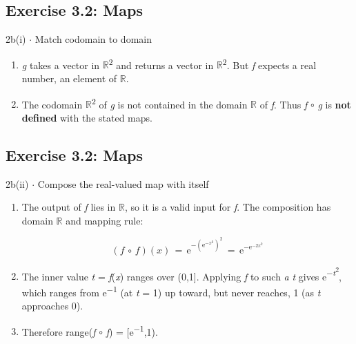 \documentclass[11pt]{article}
\begin{document}
\begin{keepsection}\subsection{Exercise 3.2: Maps}

\begin{workedbox}{2b(i) \ensuremath{\cdot} Match codomain to domain}
\begin{enumerate}
\item \textit{g} takes a vector in \ensuremath{\mathbb{R}}\textsuperscript{2} and returns a vector in \ensuremath{\mathbb{R}}\textsuperscript{2}. But \textit{f} expects a real number, an element of \ensuremath{\mathbb{R}}.
\item The codomain \ensuremath{\mathbb{R}}\textsuperscript{2} of \textit{g} is not contained in the domain \ensuremath{\mathbb{R}} of \textit{f}. Thus \textit{f} \ensuremath{\circ} \textit{g} is \textbf{not defined} with the stated maps.
\end{enumerate}
\end{workedbox}

\end{keepsection}
\begin{keepsection}\subsection{Exercise 3.2: Maps}

\begin{workedbox}{2b(ii) \ensuremath{\cdot} Compose the real-valued map with itself}
\begin{enumerate}
\item {}
The output of \textit{f} lies in \ensuremath{\mathbb{R}}, so it is a valid input for \textit{f}. The composition has domain \ensuremath{\mathbb{R}} and mapping rule:

\begin{equation*}({f}\, \circ \, {f})({x})\, =\, \mathrm{e}^{-(\mathrm{e}^{-{x}^{2}})^{2}}\, =\, \mathrm{e}^{-\mathrm{e}^{-2{x}^{2}}}\end{equation*}
\item The inner value \textit{t} = \textit{f}(\textit{x}) ranges over (0,1]. Applying \textit{f} to such \textit{a} \textit{t} gives e\textsuperscript{\ensuremath{-}\textit{t}\textsuperscript{2}}, which ranges from e\textsuperscript{\ensuremath{-}1} (at \textit{t} = 1) up toward, but never reaches, 1 (as \textit{t} approaches 0).
\item Therefore range(\textit{f} \ensuremath{\circ} \textit{f}) = [e\textsuperscript{\ensuremath{-}1},1).
\end{enumerate}
\end{workedbox}

\end{keepsection}
\end{document}
